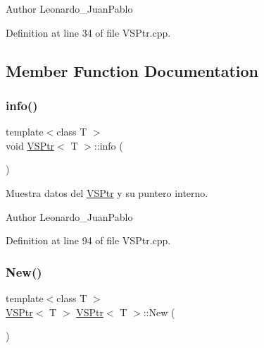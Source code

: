 \begin{DoxyAuthor}{Author}
Leonardo\+\_\+\+Juan\+Pablo 
\end{DoxyAuthor}


Definition at line 34 of file V\+S\+Ptr.\+cpp.



\subsection{Member Function Documentation}
\mbox{\label{class_v_s_ptr_a8bce3297cb819c3f35e24d7ef921539f}} 
\subsubsection{\texorpdfstring{info()}{info()}}
{\footnotesize\ttfamily template$<$class T $>$ \\
void \hyperlink{class_v_s_ptr}{V\+S\+Ptr}$<$ T $>$\+::info (\begin{DoxyParamCaption}{ }\end{DoxyParamCaption})}



Muestra datos del \hyperlink{class_v_s_ptr}{V\+S\+Ptr} y su puntero interno. 

\begin{DoxyAuthor}{Author}
Leonardo\+\_\+\+Juan\+Pablo 
\end{DoxyAuthor}


Definition at line 94 of file V\+S\+Ptr.\+cpp.

\mbox{\label{class_v_s_ptr_a4dbf1c0d3ac694fef78baa8d15ec7eb1}} 
\subsubsection{\texorpdfstring{New()}{New()}}
{\footnotesize\ttfamily template$<$class T $>$ \\
\hyperlink{class_v_s_ptr}{V\+S\+Ptr}$<$ T $>$ \hyperlink{class_v_s_ptr}{V\+S\+Ptr}$<$ T $>$\+::New (\begin{DoxyParamCaption}{ }\end{DoxyParamCaption})\hspace{0.3cm}{\ttfamily [static]}}



